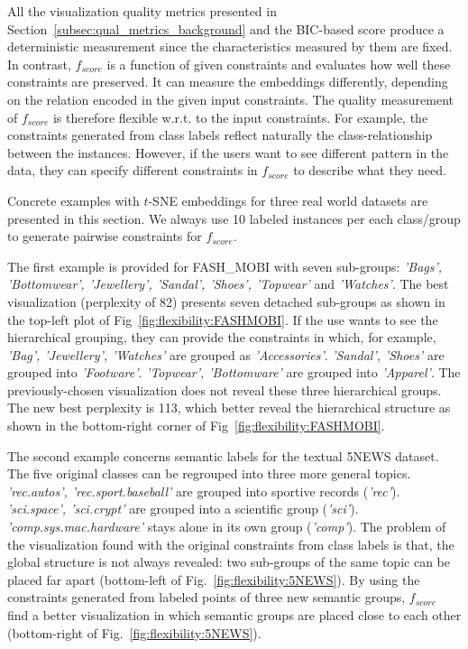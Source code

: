 All the visualization quality metrics presented in Section~\ref{subsec:qual_metrics_background} and the BIC-based score produce a deterministic measurement since the characteristics measured by them are fixed.
In contrast, $f_{score}$ is a function of given constraints and evaluates how well these constraints are preserved.
It can measure the embeddings differently, depending on the relation encoded in the given input constraints.
The quality measurement of $f_{score}$ is therefore flexible w.r.t. to the input constraints.
For example, the constraints generated from class labels reflect naturally the class-relationship between the instances.
However, if the users want to see different pattern in the data, they can specify different constraints in $f_{score}$ to describe what they need.

Concrete examples with $t$-SNE embeddings for three real world datasets are presented in this section.
We always use 10 labeled instances per each class/group to generate pairwise constraints for $f_{score}$.

The first example is provided for {FASH\_MOBI} with seven sub-groups: \emph{'Bags', 'Bottomwear', 'Jewellery', 'Sandal', 'Shoes', 'Topwear'} and \emph{'Watches'}.
The best visualization (perplexity of 82) presents seven detached sub-groups as shown in the top-left plot of Fig~\ref{fig:flexibility:FASHMOBI}.
If the use wants to see the hierarchical grouping, they can provide the constraints in which, for example, \emph{'Bag', 'Jewellery', 'Watches'} are grouped as \emph{'Accessories'}.
\emph{'Sandal', 'Shoes'} are grouped into \emph{'Footware'}.
\emph{'Topwear', 'Bottomware'} are grouped into \emph{'Apparel'}.
The previously-chosen visualization does not reveal these three hierarchical groups.
The new best perplexity is 113, which better reveal the hierarchical structure as shown in the bottom-right corner of Fig~\ref{fig:flexibility:FASHMOBI}.

The second example concerns semantic labels for the textual 5NEWS dataset.
The five original classes can be regrouped into three more general topics.
\emph{'rec.autos', 'rec.sport.baseball'} are grouped into sportive records (\emph{'rec'}).
\emph{'sci.space', 'sci.crypt'} are grouped into a scientific group (\emph{'sci'}).
\emph{'comp.sys.mac.hardware'} stays alone in its own group (\emph{'comp'}).
The problem of the visualization found with the original constraints from class labels is that, the global structure is not always revealed: two sub-groups of the same topic can be placed far apart (bottom-left of Fig.~\ref{fig:flexibility:5NEWS}).
By using the constraints generated from labeled points of three new semantic groups, $f_{score}$ find a better visualization in which semantic groups are placed close to each other (bottom-right of Fig.~\ref{fig:flexibility:5NEWS}).

